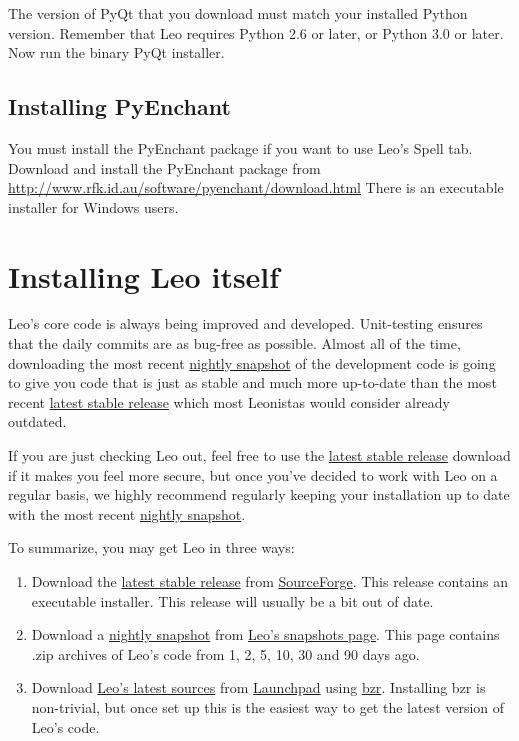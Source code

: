 \documentclass[a4paper,10pt,english]{sphinxmanual}
\begin{document}
The version of PyQt that you download must match your installed Python version.
Remember that Leo requires Python 2.6 or later, or Python 3.0 or later. Now run
the binary PyQt installer.


\subsection{Installing PyEnchant}
\label{installing:installing-pyenchant}
You must install the PyEnchant package if you want to use Leo's Spell tab.
Download and install the PyEnchant package from
\href{http://www.rfk.id.au/software/pyenchant/download.html}{http://www.rfk.id.au/software/pyenchant/download.html} There is an executable
installer for Windows users.


\section{Installing Leo itself}
\label{installing:installing-leo-itself}
Leo's core code is always being improved and developed. Unit-testing
ensures that the daily commits are as bug-free as possible. Almost all of
the time, downloading the most recent \href{http://www.greygreen.org/leo/}{nightly snapshot} of the
development code is going to give you code that is just as stable and much
more up-to-date than the most recent \href{http://sourceforge.net/projects/leo/files/Leo/4.10\%20final/}{latest stable release} which most
Leonistas would consider already outdated.

If you are just checking Leo out, feel free to use the \href{http://sourceforge.net/projects/leo/files/Leo/4.10\%20final/}{latest stable release}
download if it makes you feel more secure, but once you've
decided to work with Leo on a regular basis, we highly recommend regularly
keeping your installation up to date with the most recent \href{http://www.greygreen.org/leo/}{nightly snapshot}.

To summarize, you may get Leo in three ways:
\begin{enumerate}
\item {} 
Download the \href{http://sourceforge.net/projects/leo/files/Leo/4.10\%20final/}{latest stable release} from \href{https://sourceforge.net}{SourceForge}. This release
contains an executable installer. This release will usually be a bit out
of date.

\item {} 
Download a \href{http://www.greygreen.org/leo/}{nightly snapshot} from \href{http://www.greygreen.org/leo/}{Leo's snapshots page}. This page
contains .zip archives of Leo's code from 1, 2, 5, 10, 30 and 90 days
ago.

\item {} 
Download \href{https://code.launchpad.net/leo-editor/}{Leo's latest sources} from \href{https://code.launchpad.net/}{Launchpad} using \href{http://bazaar.canonical.com/}{bzr}.
Installing bzr is non-trivial, but once set up this is the easiest way
to get the latest version of Leo's code.

\end{enumerate}
\end{document}
